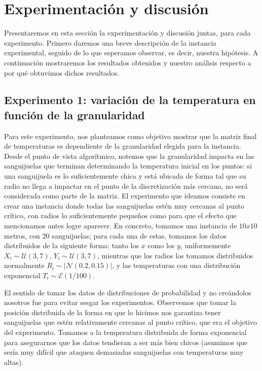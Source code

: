 \section{Experimentación y discusión}

Presentaremos en esta sección la experimentación y discusión juntas, para cada experimento. Primero 
daremos una breve descripción de la instancia 
experimental, seguido de lo que esperamos observar, es decir, nuestra hipótesis. A continuación mostraremos los 
resultados obtenidos y nuestro análisis respecto a por qué obtuvimos dichos resultados. 

\subsection{Experimento 1: variación de la temperatura en función de la granularidad}
Para este experimento, nos planteamos como objetivo mostrar que la matriz final de temperaturas es dependiente de la granularidad elegida para la instancia. Desde el punto de vista algorítmico, notemos que la granularidad impacta en las sanguijuelas que terminan determinando la temperatura inicial en los puntos: si una sanguijuela es lo suficientemente chica y está ubicada de forma tal que su radio no llega a impactar en el punto de la discretización más cercano, no será considerada como parte de la matriz. El experimento que ideamos consiste en crear una instancia donde todas las sanguijuelas estén muy cercanas al punto crítico, con radios lo suficientemente pequeños como para que el efecto que mencionamos antes logre aparecer. En concreto, tomamos una instancia de $10x10$ metros, con $20$ sanguijuelas; para cada una de estas, tomamos los datos distribuidos de la siguiente forma: tanto los $x$ como los $y$, uniformemente $X_i \sim \mathcal{U}(3, 7)$, $Y_i \sim \mathcal{U}(3, 7)$, mientras que los radios los tomamos distribuidos normalmente $R_i \sim |\mathcal{N}(0.2, 0.15)|$, y las temperaturas con una distribución exponencial $T_i \sim \mathcal{E}(1/100)$.

El sentido de tomar los datos de distribuciones de probabilidad y no creándolos nosotros fue para evitar sesgar los experimentos. Observemos que tomar la posición distribuida de la forma en que lo hicimos nos garantiza tener sanguijuelas que estén relativamente cercanas al punto crítico, que era el objetivo del experimento. Tomamos a la temperatura distribuida de forma exponencial para asegurarnos que los datos tendieran a ser más bien chicos (asumimos que sería muy difícil que ataquen demasiadas sanguijuelas con temperaturas muy altas).

